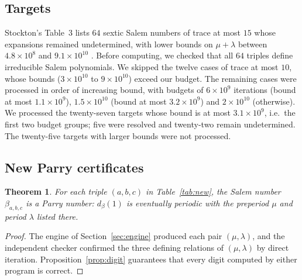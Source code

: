 \documentclass[11pt]{amsart}
\newtheorem{theorem}{Theorem}[section]
\theoremstyle{definition}
\theoremstyle{remark}
\begin{document}
\subsection{Targets}
Stockton's Table~3 lists $64$ sextic Salem numbers of trace at most $15$ whose expansions remained undetermined, with lower bounds on $\mu+\lambda$ between $4.8\times10^8$ and $9.1\times10^{10}$ \cite{Stockton}. Before computing, we checked that all $64$ triples define irreducible Salem polynomials. We skipped the twelve cases of trace at most $10$, whose bounds ($3\times10^{10}$ to $9\times10^{10}$) exceed our budget. The remaining cases were processed in order of increasing bound, with budgets of $6\times10^9$ iterations (bound at most $1.1\times10^9$), $1.5\times10^{10}$ (bound at most $3.2\times10^9$) and $2\times10^{10}$ (otherwise). We processed the twenty-seven targets whose bound is at most $3.1\times10^9$, i.e.\ the first two budget groups; five were resolved and twenty-two remain undetermined. The twenty-five targets with larger bounds were not processed.

\subsection{New Parry certificates}
\begin{theorem}\label{thm:new}
For each triple $(a,b,c)$ in Table~\ref{tab:new}, the Salem number $\beta_{a,b,c}$ is a Parry number: $d_\beta(1)$ is eventually periodic with the preperiod $\mu$ and period $\lambda$ listed there.
\end{theorem}
\begin{proof}
The engine of Section~\ref{sec:engine} produced each pair $(\mu,\lambda)$, and the independent checker confirmed the three defining relations of $(\mu,\lambda)$ by direct iteration. Proposition~\ref{prop:digit} guarantees that every digit computed by either program is correct.
\end{proof}
\end{document}
